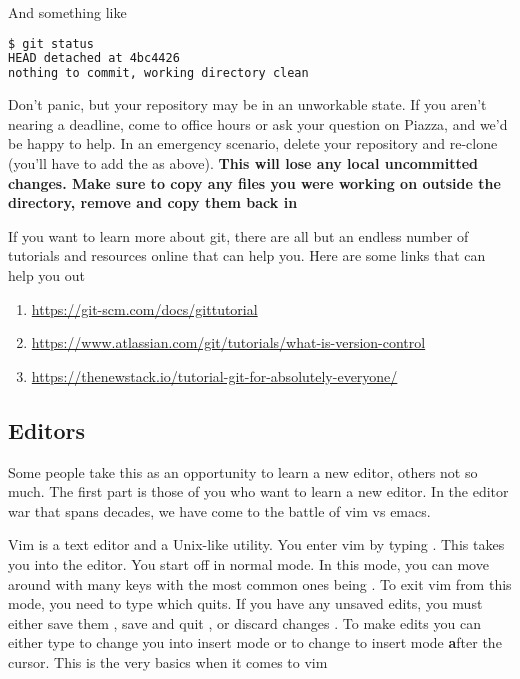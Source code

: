 And something like

\begin{lstlisting}[language=bash]
$ git status
HEAD detached at 4bc4426
nothing to commit, working directory clean
\end{lstlisting}

Don't panic, but your repository may be in an unworkable state.
If you aren't nearing a deadline, come to office hours or ask your question on Piazza, and we'd be happy to help.
In an emergency scenario, delete your repository and re-clone (you'll have to add the  as above).
\textbf{This will lose any local uncommitted changes. Make sure to copy any files you were working on outside the directory, remove and copy them back in}

If you want to learn more about git, there are all but an endless number of tutorials and resources online that can help you.
Here are some links that can help you out

\begin{enumerate}
\item \url{https://git-scm.com/docs/gittutorial}
\item \url{https://www.atlassian.com/git/tutorials/what-is-version-control}
\item \url{https://thenewstack.io/tutorial-git-for-absolutely-everyone/}
\end{enumerate}

\subsection{Editors}

Some people take this as an opportunity to learn a new editor, others not so much. The first part is those of you who want to learn a new editor. In the editor war that spans decades, we have come to the battle of vim vs emacs.

Vim is a text editor and a Unix-like utility.
You enter vim by typing .
This takes you into the editor.
You start off in normal mode.
In this mode, you can move around with many keys with the most common ones being .
To exit vim from this mode, you need to type  which quits.
If you have any unsaved edits, you must either save them , save and quit , or discard changes . To make edits you can either type  to change you into insert mode or  to change to insert mode \textbf{a}fter the cursor. This is the very basics when it comes to vim

